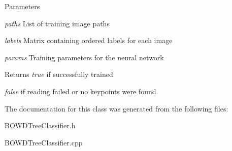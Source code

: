 \begin{DoxyParams}{Parameters}
\item[{\em paths}]List of training image paths \item[{\em labels}]Matrix containing ordered labels for each image \item[{\em params}]Training parameters for the neural network \end{DoxyParams}
\begin{DoxyReturn}{Returns}
{\itshape true\/} if successfully trained\par
 {\itshape false\/} if reading failed or no keypoints were found 
\end{DoxyReturn}


The documentation for this class was generated from the following files:\begin{DoxyCompactItemize}
\item 
BOWDTreeClassifier.h\item 
BOWDTreeClassifier.cpp\end{DoxyCompactItemize}
